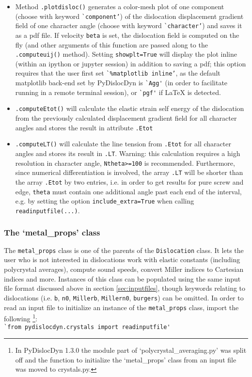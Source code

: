 \documentclass[11pt,letterpaper,oneside,pdftex]{article}
\begin{document}
\begin{itemize}
\item Method \verb|.plotdisloc()| generates a color-mesh plot of one component (choose with keyword \verb|`component’|) of the dislocation displacement gradient field of one character angle (choose with keyword \verb|`character’|) and saves it as a pdf file.
If velocity \verb|beta| is set, the dislocation field is computed on the fly (and other arguments of this function are passed along to the \verb|.computeuij()| method).
Setting \verb|showplt=True| will display the plot inline (within an ipython or jupyter session) in addition to saving a pdf;
this option requires that the user first set \verb|`%matplotlib inline’|, as the default matplotlib back-end set by PyDislocDyn is \verb|`Agg'| (in order to facilitate running in a remote terminal session), or \verb|`pgf'| if LaTeX is detected.

\item \verb|.computeEtot()| will calculate the elastic strain self energy of the dislocation from the previously calculated displacement gradient field for all character angles and stores the result in attribute \verb|.Etot|

\item \verb|.computeLT()| will calculate the line tension from \verb|.Etot| for all character angles and stores its result in \verb|.LT|.
Warning: this calculation requires a high resolution in character angle, \verb|Ntheta>=100| is recommended.
Furthermore, since numerical differentiation is involved, the array \verb|.LT| will be shorter than the array \verb|.Etot| by two entries, i.e. in order to get results for pure screw and edge, \verb|theta| must contain one additional angle past each end of the interval, e.g. by setting the option \verb|include_extra=True| when calling \verb|readinputfile(...)|.
\end{itemize}


\subsubsection{The `metal\_props' class}
\label{sec:metal_props}

The \verb|metal_props| class is one of the parents of the \verb|Dislocation| class.
It lets the user who is not interested in dislocations work with elastic constants (including polycrystal averages), compute sound speeds, convert Miller indices to Cartesian indices and more.
Instances of this class can be populated using the same input file format discussed above in section \ref{sec:inputfiles}, though keywords relating to dislocations (i.e. \verb|b|, \verb|n0|, \verb|Millerb|, \verb|Millern0|, \verb|burgers|) can be omitted.
In order to read an input file to initialize an instance of the \verb|metal_props| class, import the following
\footnote{In PyDislocDyn 1.3.0 the module part of `polycrystal\_averaging.py' was split off and the function to initialize the `metal\_props' class from an input file was moved to crystals.py.}:
\\\verb|`from pydislocdyn.crystals import readinputfile'|
\end{document}
